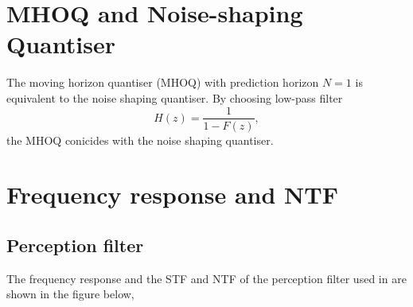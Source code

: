\documentclass[a4paper]{article}
\begin{document}
\section{MHOQ and Noise-shaping Quantiser}
The moving horizon quantiser (MHOQ) with prediction horizon $N = 1$ is equivalent to the noise shaping quantiser.  By choosing low-pass filter $$H(z)  = \frac{1 }{ 1- F(z)},$$  the MHOQ conicides with the noise shaping quantiser.


\section{Frequency response and NTF}
\subsection{Perception filter}
The  frequency response and the STF and NTF of the perception filter used in  
\cite{goodwin2003moving} are shown in the
figure below, 
\end{document}
